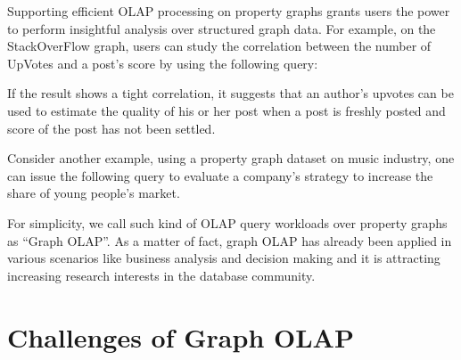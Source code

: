 Supporting efficient OLAP processing on property graphs grants users the power to perform insightful analysis over structured graph data. For example, on the StackOverFlow graph, users can study the correlation between the number of UpVotes and a post's score by using the following query:


If the result shows a tight correlation, it suggests that an author’s upvotes can be used to estimate the quality of his or her post when a post is freshly posted and score of the post has not been settled.


Consider another example, using a property graph dataset on music industry,  one can issue the following query to evaluate a company's strategy to increase the share of young people's market.



For simplicity, we call such kind of OLAP query workloads over property graphs as ``Graph OLAP''. As a matter of fact, graph OLAP has already been applied in various scenarios like business analysis and decision making and it is attracting increasing research interests in the database community.



\section{Challenges of Graph OLAP}


